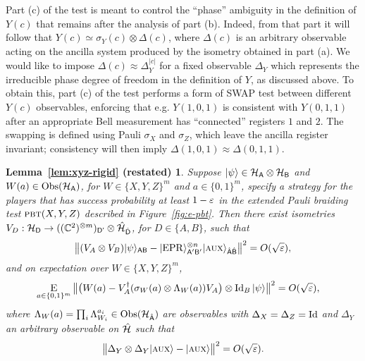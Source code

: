 Part (c) of the test is meant to control the ``phase'' ambiguity in the definition of $Y(c)$ that remains after the analysis of part (b). Indeed, from that part it will follow that $Y(c) \simeq \sigma_Y(c) \otimes \Delta(c)$, where $\Delta(c)$ is an arbitrary observable acting on the ancilla system produced by the isometry obtained in part (a). We would like to impose $\Delta(c) \approx \Delta_Y^{|c|}$ for a fixed observable $\Delta_Y$ which  represents the irreducible phase degree of freedom in the definition of $Y$, as discussed above. To obtain this, part (c) of the test performs a form of SWAP test between different $Y(c)$ observables, enforcing that e.g. $Y(1,0,1)$ is consistent with $Y(0,1,1)$ after an appropriate Bell measurement has ``connected'' registers $1$ and $2$. The swapping is defined using Pauli $\sigma_X$ and $\sigma_Z$, which leave the ancilla register invariant; consistency will then imply $\Delta(1,0,1) \approx \Delta(0,1,1)$.  

\newtheorem*{lem:xyz-rigid}{Lemma~\ref{lem:xyz-rigid} (restated)}

\begin{lem:xyz-rigid}
Suppose $|\psi\rangle\in\mathcal{H}_{\textsf{A}}\otimes \mathcal{H}_{\textsf{B}}$ and $W(a) \in \mathrm{Obs}(\mathcal{H}_{\textsf{A}})$, for $W\in \{X,Y,Z\}^m$ and $a\in\{0,1\}^m$, specify a strategy for the players that has success probability at least $1-\varepsilon$ in the extended Pauli braiding test $\textsc{pbt}(X,Y,Z)$ described in Figure~\ref{fig:e-pbt}. 
Then there exist isometries $V_D:\mathcal{H}_{\textsf{D}} \to ((\mathbb{C}^2)^{\otimes m})_{{\textsf{D'}}}  \otimes \hat{\mathcal{H}}_{\hat{{\textsf{D}}}}$, for $D\in\{A,B\}$, such that
$$\big\| (V_A \otimes V_B) |\psi\rangle_{{\textsf{AB}}} - |{\rm EPR}\rangle_{{\textsf{A}}'{\textsf{B}}'}^{\otimes n} |\textsc {aux}\rangle_{\hat{{\textsf{A}}}\hat{{\textsf{B}}}} \big\|^2 = O(\sqrt{\varepsilon}),$$
and on expectation over  $W\in \{X,Y,Z\}^m$,
\begin{align}\label{eq:test-sigmay-2}
 \mathop{\textsc{E}}_{a\in\{0,1\}^m} \big\| \big(W(a) -V_A^\dagger (\sigma_W(a) \otimes \Lambda_W(a)) V_A\big) \otimes \mathop{\rm Id}\nolimits_B |\psi\rangle \big\|^2 &= O(\sqrt{\varepsilon}),
\end{align}
where $\Lambda_W(a) = \prod_i \Lambda_{W_i}^{a_i} \in \mathrm{Obs}({\mathcal{H}}_{\hat{{\textsf{A}}}})$ are observables with $\Delta_{X}=\Delta_{Z}=\mathop{\rm Id}\nolimits$ and $\Delta_{Y}$ an arbitrary observable on $\hat{\mathcal{H}}$ such that
	$$ \big\|\Delta_Y \otimes \Delta_Y |\textsc {aux}\rangle - |\textsc {aux}\rangle \big\|^2 = O(\sqrt{\varepsilon}).$$
\end{lem:xyz-rigid}

